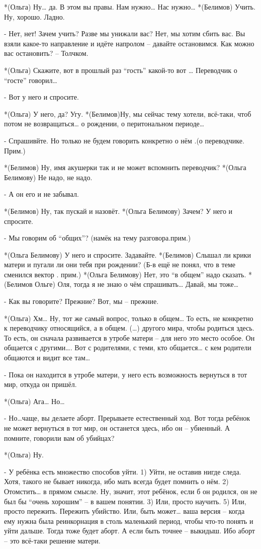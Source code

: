 *(Ольга) Ну… да. В этом вы правы. Нам  нужно… Нас нужно…
*(Белимов) Учить. Ну, хорошо. Ладно.

- Нет, нет! Зачем учить? Разве мы унижали вас? Нет, мы хотим сбить вас. Вы взяли какое-то направление и идёте напролом – давайте остановимся. Как можно вас остановить? – Толчком.

*(Ольга) Скажите, вот в прошлый раз “гость” какой-то вот … Переводчик о “госте” говорил…

- Вот у него и спросите.

*(Ольга) У него, да? Угу.
*(Белимов)Ну, мы сейчас тему хотели, всё-таки, чтоб потом не возвращаться… о рождении, о перитональном периоде…

- Спрашивйте. Но только не будем говорить конкретно о нём .(о переводчике. Прим.)

*(Белимов) Ну, имя акушерки так и не может вспомнить переводчик?
*(Ольга Белимову) Не надо, не надо.

- А он его и не забывал.

*(Белимов) Ну, так пускай и назовёт.
*(Ольга Белимову) Зачем? У него и спросите.

- Мы говорим об “общих”? (намёк на тему разговора.прим.) 

*(Ольга Белимову) У него и спросите.  Задавайте.
*(Белимов) Слышал ли крики матери и пугали ли они тебя при рождении? (Б-в ещё не понял, что в теме сменился вектор . прим.)
*(Ольга Белимову) Нет, это “в общем” надо сказать.
*(Белимов Ольге) Оля, тогда я не знаю о чём спрашивать… Давай, мы тоже…

- Как вы говорите? Прежние? Вот, мы – прежние.

*(Ольга) Хм… Ну, тот же самый вопрос, только в общем… То есть, не конкретно к переводчику относящийся, а в общем. (…) другого мира, чтобы родиться здесь. То есть, он сначала развивается в утробе матери – для него это место особое. Он общается с другими…. Вот с родителями, с теми, кто общается… с кем родители общаются и видит все там…

- Пока он находится в утробе матери, у него есть возможность вернуться в тот мир, откуда он пришёл.

*(Ольга) Ага… Но…

- Но…чаще, вы делаете аборт. Прерываете естественный ход. Вот тогда ребёнок не может вернуться в тот мир, он останется здесь, ибо он – убиенный. А помните, говорили вам об убийцах? 

*(Ольга) Ну.

- У ребёнка есть множество способов уйти. 1) Уйти, не оставив нигде следа. Хотя, такого не бывает  никогда, ибо мать всегда будет помнить о нём. 2) Отомстить… в прямом смысле. Ну, значит, этот ребёнок, если б он родился, он не был бы “очень хорошим” – в вашем понятии. 3) Или, просто научить. 5) Или, просто пережить. Пережить убийство. Или, быть может… ваша версия – когда ему нужна была реинкорнация в столь маленький период, чтобы что-то понять и уйти дальше. Тогда тоже будет аборт. А если быть точнее – выкидыш. Ибо аборт – это всё-таки решение матери.

